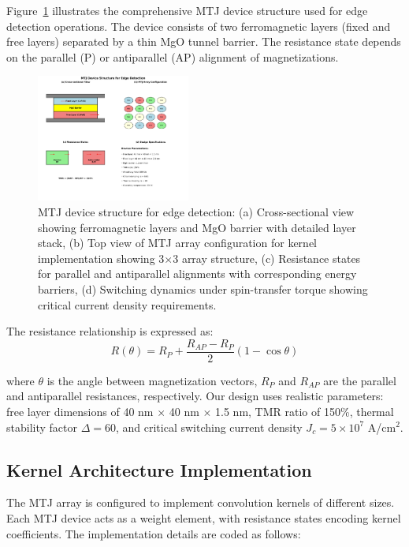 \documentclass[conference]{IEEEtran}
\begin{document}
Figure~\ref{fig:device_design} illustrates the comprehensive MTJ device structure used for edge detection operations. The device consists of two ferromagnetic layers (fixed and free layers) separated by a thin MgO tunnel barrier. The resistance state depends on the parallel (P) or antiparallel (AP) alignment of magnetizations.

\begin{figure}[htbp]
\centerline{\includegraphics[width=0.45\textwidth]{device_schematic.png}}
\caption{MTJ device structure for edge detection: (a) Cross-sectional view showing ferromagnetic layers and MgO barrier with detailed layer stack, (b) Top view of MTJ array configuration for kernel implementation showing 3$\times$3 array structure, (c) Resistance states for parallel and antiparallel alignments with corresponding energy barriers, (d) Switching dynamics under spin-transfer torque showing critical current density requirements.}
\label{fig:device_design}
\end{figure}

The resistance relationship is expressed as:
\begin{equation}
R(\theta) = R_P + \frac{R_{AP} - R_P}{2}(1 - \cos\theta)
\label{eq:resistance}
\end{equation}

where $\theta$ is the angle between magnetization vectors, $R_P$ and $R_{AP}$ are the parallel and antiparallel resistances, respectively. Our design uses realistic parameters: free layer dimensions of 40 nm $\times$ 40 nm $\times$ 1.5 nm, TMR ratio of 150\%, thermal stability factor $\Delta = 60$, and critical switching current density $J_c = 5 \times 10^7$ A/cm$^2$.

\subsection{Kernel Architecture Implementation}

The MTJ array is configured to implement convolution kernels of different sizes. Each MTJ device acts as a weight element, with resistance states encoding kernel coefficients. The implementation details are coded as follows:
\end{document}
